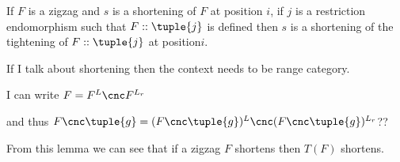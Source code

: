 {\begin{corollary}
If $F$ is a zigzag and $s$ is a shortening of $F$ at position $i$,
if $j$ is a restriction endomorphism 
such that $F :: \tuple{j}$ is defined then
$s$ is a shortening of 
the tightening of $F :: \tuple{j}$ at position$i$.
\end{corollary}

\begin{aside}
If I talk about shortening then the context
needs to be  range category.
\end{aside}

\begin{aside}
I can write  $F= F^{L} \cnc F^{L_r}$

and thus $F\cnc\tuple{g} = (F\cnc\tuple{g})^{L} \cnc (F\cnc\tuple{g})^{L_r}$??

\end{aside}

From this lemma we can see that if a zigzag $F$ shortens then $T(F)$ shortens.


}
